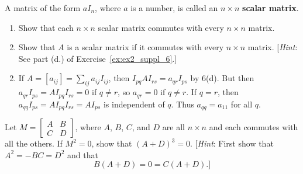 \documentclass{ximera}
\begin{document}
\begin{problem}
A matrix of the form $aI_{n}$, where $a$ is a number, is called an $n \times n$ \textbf{scalar matrix}.


\begin{enumerate}[label={\alph*.}]
\item Show that each $n \times n$ scalar matrix commutes with every $n \times n$ matrix.

\item Show that $A$ is a scalar matrix if it commutes with every $n \times n$ matrix. [\textit{Hint}: See part (d.) of Exercise~\ref{ex:ex2_suppl_6}.]

\end{enumerate}
\begin{hint}
\begin{enumerate}[label={\alph*.}]
\setcounter{enumi}{1}
\item  If $A = \left[a_{ij}\right] = \sum_{ij}a_{ij}I_{ij}$, then $I_{pq}AI_{rs} = a_{qr}I_{ps}$ by 6(d). But then $a_{qr}I_{ps} = AI_{pq}I_{rs} = 0$ if $q \neq r$, so $a_{qr} = 0$ if $q \neq r$. If $q = r$, then $a_{qq}I_{ps} = AI_{pq}I_{rs} = AI_{ps}$ is independent of $q$. Thus $a_{qq} = a_{11}$ for all $q$.

\end{enumerate}
\end{hint}
\end{problem}

\begin{problem}
Let $M = \left[ \begin{array}{rr}
A & B \\
C & D
\end{array} \right]$,
 where $A$, $B$, $C$, and $D$ are all $n \times n$ and each commutes with all the others. If $M^{2} = 0$, show that $(A + D)^{3} = 0$. [\textit{Hint}: First show that $A^{2} = -BC = D^{2}$ and that
\begin{equation*}
B(A + D) = 0 = C(A + D).]
\end{equation*}


\end{problem}
\end{document}
